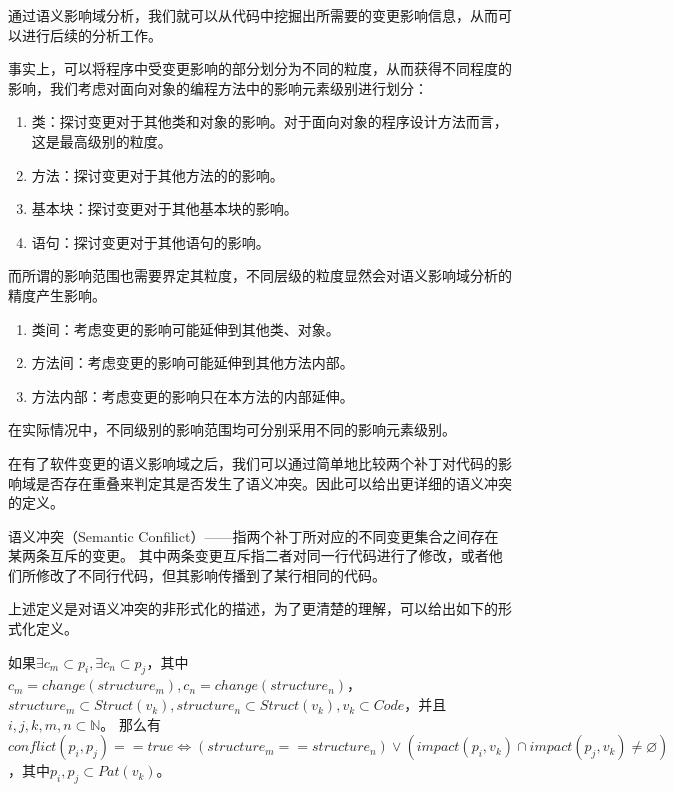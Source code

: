 通过语义影响域分析，我们就可以从代码中挖掘出所需要的变更影响信息，从而可以进行后续的分析工作。

事实上，可以将程序中受变更影响的部分划分为不同的粒度，从而获得不同程度的影响，我们考虑对面向对象的编程方法中的影响元素级别进行划分：

\begin{enumerate}
	\item 类：探讨变更对于其他类和对象的影响。对于面向对象的程序设计方法而言，这是最高级别的粒度。
	\item 方法：探讨变更对于其他方法的的影响。
	\item 基本块：探讨变更对于其他基本块的影响。
	\item 语句：探讨变更对于其他语句的影响。
\end{enumerate}

而所谓的影响范围也需要界定其粒度，不同层级的粒度显然会对语义影响域分析的精度产生影响。

\begin{enumerate}
	\item 类间：考虑变更的影响可能延伸到其他类、对象。
	\item 方法间：考虑变更的影响可能延伸到其他方法内部。
	\item 方法内部：考虑变更的影响只在本方法的内部延伸。
\end{enumerate}

在实际情况中，不同级别的影响范围均可分别采用不同的影响元素级别。

在有了软件变更的语义影响域之后，我们可以通过简单地比较两个补丁对代码的影响域是否存在重叠来判定其是否发生了语义冲突。因此可以给出更详细的语义冲突的定义。

\begin{definition}
	\label {define_conflict}
	语义冲突（Semantic Confilict）——指两个补丁所对应的不同变更集合之间存在某两条互斥的变更。
	其中两条变更互斥指二者对同一行代码进行了修改，或者他们所修改了不同行代码，但其影响传播到了某行相同的代码。
\end{definition}

上述定义是对语义冲突的非形式化的描述，为了更清楚的理解，可以给出如下的形式化定义。

\begin{definition}
	\label {problem}
	如果$\exists c_m \subset p_i, \exists c_n \subset p_j$，其中$c_m = change(structure_m),c_n = change(structure_n)$， $structure_m \subset Struct(v_k), structure_n \subset Struct(v_k), v_k \subset Code$，并且$i,j,k,m,n \subset \mathbb{N}$。
	那么有$conflict(p_i,p_j) == true \iff (structure_m == structure_n) \lor (impact(p_i,v_k) \cap impact(p_j,v_k) \neq \varnothing)$，其中$p_i,p_j \subset Pat(v_k)$。
\end{definition}


